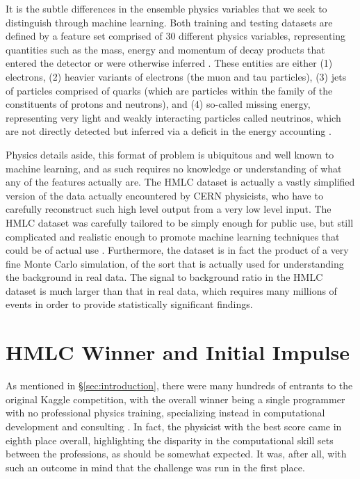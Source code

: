 \documentclass{article} %
\begin{document}
It is the subtle differences in the ensemble physics variables that we seek to distinguish through machine learning. Both training and testing datasets are defined by a feature set comprised of 30 different physics variables, representing quantities such as the mass, energy and momentum of decay products that entered the detector or were otherwise inferred \cite{Rousseau2015, Chen2015}. These entities are either (1) electrons, (2) heavier variants of electrons (the muon and tau particles), (3) jets of particles comprised of quarks (which are particles within the family of the constituents of protons and neutrons), and (4) so-called missing energy, representing very light and weakly interacting particles called neutrinos, which are not directly detected but inferred via a deficit in the energy accounting \cite{Chen2015}.

Physics details aside, this format of problem is ubiquitous and well known to machine learning, and as such requires no knowledge or understanding of what any of the features actually are. The HMLC dataset is actually a vastly simplified version of the data actually encountered by CERN physicists, who have to carefully reconstruct such high level output from a very low level input. The HMLC dataset was carefully tailored to be simply enough for public use, but still complicated and realistic enough to promote machine learning techniques that could be of actual use \cite{Rousseau2015}. Furthermore, the dataset is in fact the product of a very fine Monte Carlo simulation, of the sort that is actually used for understanding the background in real data. The signal to background ratio in the HMLC dataset is much larger than that in real data, which requires many millions of events in order to provide statistically significant findings.


\section{HMLC Winner and Initial Impulse}
\label{sec:hmlc_winner_and_initial_impulse}

As mentioned in \S\ref{sec:introduction}, there were many hundreds of entrants to the original Kaggle competition, with the overall winner being a single programmer with no professional physics training, specializing instead in computational development and consulting \cite{Rousseau2015}. In fact, the physicist with the best score came in eighth place overall, highlighting the disparity in the computational skill sets between the professions, as should be somewhat expected. It was, after all, with such an outcome in mind that the challenge was run in the first place.
\end{document}
